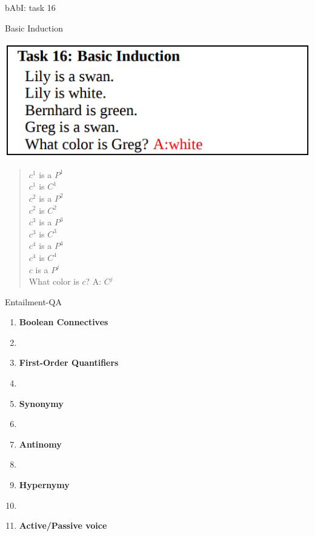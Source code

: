 \documentclass[10pt]{beamer}
\begin{document}
\begin{frame}{bAbI: task 16}

\alert{Basic Induction}

\begin{center}
\includegraphics[scale=0.28]{images/babi16.png}
\end{center}
\begin{quote} 
\centering 
$c^{1}$ is a $P^{1}$\\
$c^{1}$ is $C^{1}$\\
$c^{2}$ is a $P^{2}$\\
$c^{2}$ is $C^{2}$\\
$c^{3}$ is a $P^{3}$\\
$c^{3}$ is $C^{3}$\\
$c^{4}$ is a $P^{4}$\\
$c^{4}$ is $C^{4}$\\
$c$ is a $P^{j}$\\
What color is $c$? \alert{A: $C^j$}\\
\end{quote}

\end{frame}




\begin{frame}{Entailment-QA}

\begin{enumerate}
\item \textbf{Boolean Connectives}
\item[]
\item \textbf{First-Order Quantifiers}
\item[]
\item \textbf{Synonymy}
\item[]
\item \textbf{Antinomy}
\item[]
\item \textbf{Hypernymy}
\item[]
\item \textbf{Active/Passive voice}
\end{enumerate}
\end{frame}
\end{document}
